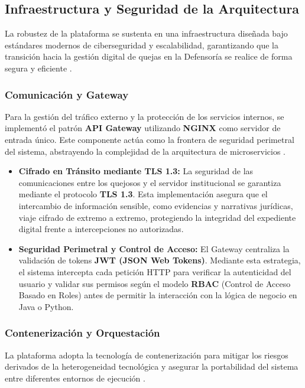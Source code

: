 \subsection{Infraestructura y Seguridad de la Arquitectura}

La robustez de la plataforma se sustenta en una infraestructura diseñada bajo estándares modernos de ciberseguridad y escalabilidad, garantizando que la transición hacia la gestión digital de quejas en la Defensoría se realice de forma segura y eficiente .

\subsubsection{Comunicación y Gateway}

Para la gestión del tráfico externo y la protección de los servicios internos, se implementó el patrón \textbf{API Gateway} utilizando \textbf{NGINX} como servidor de entrada único. Este componente actúa como la frontera de seguridad perimetral del sistema, abstrayendo la complejidad de la arquitectura de microservicios .

\begin{itemize}
    \item \textbf{Cifrado en Tránsito mediante TLS 1.3:} La seguridad de las comunicaciones entre los quejosos y el servidor institucional se garantiza mediante el protocolo \textbf{TLS 1.3}. Esta implementación asegura que el intercambio de información sensible, como evidencias y narrativas jurídicas, viaje cifrado de extremo a extremo, protegiendo la integridad del expediente digital frente a intercepciones no autorizadas.
    \item \textbf{Seguridad Perimetral y Control de Acceso:} El Gateway centraliza la validación de tokens \textbf{JWT (JSON Web Tokens)}. Mediante esta estrategia, el sistema intercepta cada petición HTTP para verificar la autenticidad del usuario y validar sus permisos según el modelo \textbf{RBAC} (Control de Acceso Basado en Roles) antes de permitir la interacción con la lógica de negocio en Java o Python.
\end{itemize}

\subsubsection{Contenerización y Orquestación}

La plataforma adopta la tecnología de contenerización para mitigar los riesgos derivados de la heterogeneidad tecnológica y asegurar la portabilidad del sistema entre diferentes entornos de ejecución .

